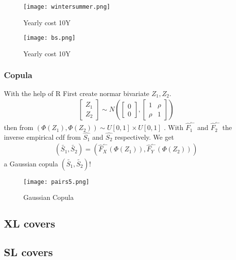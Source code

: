 \documentclass[11pt]{article}
\begin{document}
 \begin{figure}[H]
 \center
  \texttt{[image: wintersummer.png]}
  \caption{Yearly cost 10Y}
  \label{fig:season}
\end{figure}

 \begin{figure}[H]
 \center
  \texttt{[image: bs.png]}
  \caption{Yearly cost 10Y}
  \label{fig:season}
\end{figure}

\subsubsection*{Copula}
With the help of R 
First create normar bivariate $Z_1,Z_2$.
\begin{align} \label{eq:bi1}
	 \begin{bmatrix} Z_1 \\ Z_2\end{bmatrix} \sim N\left(\begin{bmatrix} 0 \\ 0\end{bmatrix},\begin{bmatrix} 1&\rho \\ \rho&1\end{bmatrix}\right)
\end{align}
then from   $\left(\Phi(Z_1),\Phi(Z_2)\right) \sim  U[0,1] \times U[0,1]$ .
With $\hat{F}_1^\leftharpoonup$ and $\hat{F}_2^\leftharpoonup$ the inverse empirical cdf from $\hat{S_1}$ and $\hat{S_2}$ respectively.
We get
\begin{align} \label{eq:bi3}
	  \left(\tilde{S_1},\tilde{S_2}\right) = \left(\hat{F}_X^\leftharpoonup(\Phi(Z_1)),\hat{F}_Y^\leftharpoonup(\Phi(Z_2))\right) 
\end{align}
a Gaussian copula $ \left(\tilde{S_1},\tilde{S_2}\right)$!

 \begin{figure}[H]
 \center
  \texttt{[image: pairs5.png]}
  \caption{Gaussian Copula}
  \label{fig:samplefig5}
\end{figure}

\subsection*{XL covers}

\subsection*{SL covers}
\end{document}
